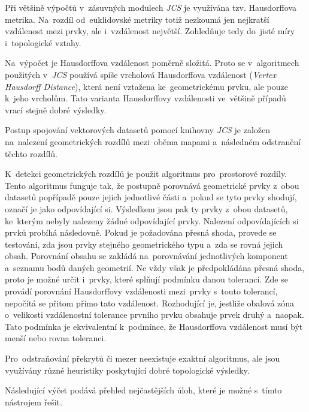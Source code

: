 Při většině výpočtů v~zásuvných modulech \textit{JCS} je využívána tzv. 
Hausdorffova metrika. Na~rozdíl od~euklidovské metriky totiž nezkoumá jen
nejkratší vzdálenost mezi prvky, ale i~vzdálenost největší.
Zohledňuje tedy do~jisté míry i~topologické vztahy.  %

Na~výpočet je Hausdorffova vzdálenost poměrně složitá. Proto se v~algoritmech
použitých v~\textit{JCS} používá spíše vrcholová Hausdorffova vzdálenost 
(\textit{Vertex Hausdorff Distance}), která není vztažena ke~geometrickému 
prvku, ale pouze k~jeho vrcholům. Tato varianta Hausdorffovy vzdálenosti 
ve~většině případů vrací stejně dobré výsledky. 

Postup spojování vektorových datasetů pomocí knihovny \textit{JCS} je založen
na~na\-le\-zení geometrických rozdílů mezi~oběma mapami a~následném odstranění 
těchto rozdílů.

K~detekci geometrických rozdílů je použit algoritmus pro~prostorové rozdíly.
Tento algoritmus funguje tak, že postupně porovnává geometrické prvky z~obou 
datasetů popřípadě pouze jejich jednotlivé části a~pokud se tyto prvky shodují,
označí je jako odpovídající si. Výsledkem jsou pak ty prvky z~obou datasetů, 
ke~kterým nebyly nalezeny žádné odpovídající prvky. Nalezení odpovídajících si
prvků probíhá následovně. Pokud je požadována přesná shoda, provede se 
testování, zda jsou prvky stejného geometrického typu a~zda se rovná jejich 
obsah. Porovnání obsahu se zakládá na~porovnávání jednotlivých komponent 
a~seznamu bodů daných geometrií. Ne vždy však je předpokládána přesná shoda,
proto je možné určit i~prvky, které splňují podmínku danou tolerancí. Zde se
provádí porovnání Hausdorffovy vzdálenosti mezi~prvky s~touto tolerancí, 
nepočítá se přitom přímo tato vzdálenost. Rozhodující je, jestliže obalová 
zóna o~velikosti vzdálenostní tolerance prvního prvku obsahuje prvek druhý 
a~naopak. Tato podmínka je ekvivalentní k~podmínce, že Hausdorffova vzdálenost
musí být menší nebo rovna toleranci. 


Pro~odstraňování překrytů či mezer neexistuje exaktní algoritmus,
ale jsou vy\-užívány různé heuristiky poskytující dobré topologické výsledky.

Následující výčet podává přehled nejčastějších úloh, které je možné 
s~tímto nástrojem řešit.

